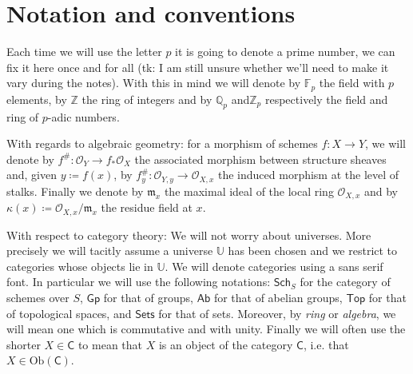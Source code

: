 \section*{Notation and conventions}
Each time we will use the letter $p$ it is going to denote a prime number,
we can fix it here once and for all (tk: I am still unsure whether we'll
need to make it vary during the notes).
With this in mind we will denote by $\mathbb{F}_{p}$ the field with $p$ elements,
by $\mathbb{Z}$ the ring of integers and by $\mathbb{Q}_p$ and$\mathbb{Z}_{p}$
respectively the field and ring of $p$-adic numbers.


With regards to algebraic geometry: for a morphism of schemes $f\colon X \to Y$,
we will denote by $f^{\#}\colon \mathcal{O}_{ Y } \to f_*\mathcal{O}_{ X }$ the
associated morphism between structure sheaves and, given $y \coloneqq f(x)$,
by $f_y^{\#}\colon \mathcal{O}_{ Y,y } \to \mathcal{O}_{ X,x }$ the induced morphism
at the level of stalks.
Finally we denote by $\mathfrak{m}_x$ the maximal ideal of the local ring
$\mathcal{O}_{ X,x }$ and by $\kappa(x) \coloneqq \mathcal{O}_{ X,x }/\mathfrak{m}_x$
the residue field at $x$.

With respect to category theory:
We will not worry about universes. More precisely we will
tacitly assume a universe $\mathbb{U}$ has been chosen
and we restrict to categories whose objects lie in $\mathbb{U}$.
We will denote categories using a sans serif font.
In particular we will use the following notations:
$\mathsf{Sch}_{S}$ for the category of schemes over $S$,
$\mathsf{Gp}$ for that of groups,
$\mathsf{Ab}$ for that of abelian groups,
$\mathsf{Top}$ for that of topological spaces,
and $\mathsf{Sets}$ for that of sets.
Moreover, by {\em ring} or {\em algebra}, we will mean one which is commutative and with unity.
Finally we will often use the shorter $X \in \mathsf{C}$ to mean that $X$ is an object
of the category $\mathsf{C}$, i.e. that $X \in \mathrm{Ob} \left(\mathsf{C}\right)$.
